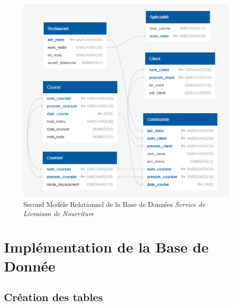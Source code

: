 \documentclass[french]{article}
\begin{document}
            \begin{figure}[ht] %
                \centering
                \includegraphics[scale = 0.7]{Image/modele_relationnel_2.png}
                \caption{Second Modèle Relationnel de la Base de Données \emph{Service de Livraison de Nourriture}}
                \label{image_modele_relationnel_2}
            \end{figure}
            \newpage

    \section{Implémentation de la Base de Donnée}
        \subsection*{Création des tables}
        
\end{document}
